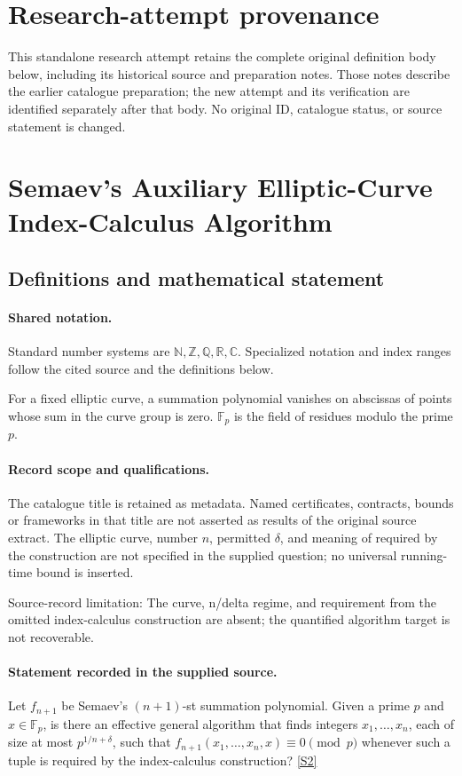 \documentclass[11pt]{article}
\begin{document}
\section*{Research-attempt provenance}
This standalone research attempt retains the complete original definition body below,
including its historical source and preparation notes. Those notes describe the
earlier catalogue preparation; the new attempt and its verification are identified
separately after that body. No original ID, catalogue status, or source statement is changed.

\section{Semaev's Auxiliary Elliptic-Curve Index-Calculus Algorithm}\label{statement}

\subsection{Definitions and mathematical statement}

\paragraph{Shared notation.}Standard number systems are $\mathbb N,\mathbb Z,\mathbb Q,\mathbb R,\mathbb C$. Specialized notation and index ranges follow the cited source and the definitions below.


For a fixed elliptic curve, a summation polynomial vanishes on abscissas of points whose sum in the curve group is zero. $\mathbb F_p$ is the field of residues modulo the prime $p$.
\paragraph{Record scope and qualifications.}
The catalogue title is retained as metadata. Named certificates, contracts, bounds or frameworks in that title are not asserted as results of the original source extract.
The elliptic curve, number $n$, permitted $\delta$, and meaning of required by the construction are not specified in the supplied question; no universal running-time bound is inserted.

Source-record limitation: The curve, n/delta regime, and requirement from the omitted index-calculus construction are absent; the quantified algorithm target is not recoverable.
\paragraph{Statement recorded in the supplied source.}
Let $f_{n+1}$ be Semaev's $(n+1)$-st summation polynomial. Given a prime $p$ and $x\in\mathbb{F}_p$, is there an effective general algorithm that finds integers $x_1,\ldots,x_n$, each of size at most $p^{1/n+\delta}$, such that $f_{n+1}(x_1,\ldots,x_n,x)\equiv0\pmod p$ whenever such a tuple is required by the index-calculus construction? \href{https://doi.org/10.4171/owr/2004/54}{[S2]}
\end{document}
